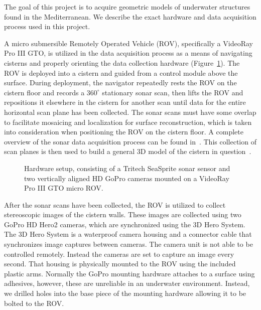 \documentclass[a4paper,twoside]{article}
\begin{document}
\noindent The goal of this project is to acquire geometric models of underwater structures found in the Mediterranean.  We describe the exact hardware and data acquisition process used in this project.

A micro submersible Remotely Operated Vehicle (ROV), specifically a VideoRay Pro III GTO, is utilized in the data acquisition process as a means of navigating cisterns and properly orienting the data collection hardware (Figure~\ref{fig:ROV}). The ROV is deployed into a cistern and guided from a control module above the surface. During deployment, the navigator repeatedly rests the ROV on the cistern floor and records a $360^{\circ}$ stationary sonar scan, then lifts the ROV and repositions it elsewhere in the cistern for another scan until data for the entire horizontal scan plane has been collected. The sonar scans must have some overlap to facilitate mosaicing and localization for surface reconstruction, which is taken into consideration when positioning the ROV on the cistern floor. A complete overview of the sonar data acquisition process can be found in~\cite{ClarkVast}.  This collection of scan planes is then used to build a general 3D model of the cistern in question~\cite{ICEX11}.
  
\begin{figure}[!h]
   \vspace{-0.2cm}
   \caption{Hardware setup, consisting of a Tritech SeaSprite sonar sensor and two vertically aligned HD GoPro cameras mounted on a VideoRay Pro III GTO micro ROV.}
  \label{fig:ROV}
 \end{figure}

After the sonar scans have been collected, the ROV is utilized to collect stereoscopic images of the cistern walls.
These images are collected using two GoPro HD Hero2 cameras, which are synchronized using the 3D Hero System.  
The 3D Hero System is a waterproof camera housing and a connector cable that synchronizes image captures between cameras.
The camera unit is not able to be controlled remotely.  
Instead the cameras are set to capture an image every second.
That housing is physically mounted to the ROV using the included plastic arms. 
Normally the GoPro mounting hardware attaches to a surface using adhesives, however, these are unreliable in an underwater environment.  
Instead, we drilled holes into the base piece of the mounting hardware allowing it to be bolted to the ROV.    
\end{document}
